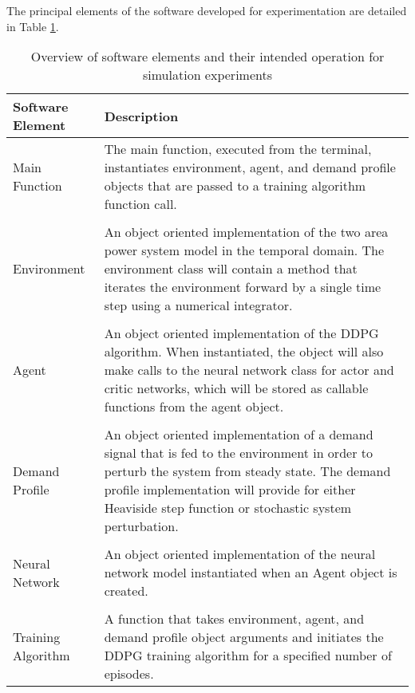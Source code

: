 The principal elements of the software developed for experimentation are detailed in Table \ref{tab:software_elements}.
\begin{table}[h]
	\centering
	\caption{Overview of software elements and their intended operation for simulation experiments}
	\begin{tabular}{lp{10cm}}
		\toprule
		\textbf{Software Element} & \textbf{Description} \\
		\midrule
		Main Function & The main function, executed from the terminal, instantiates environment, agent, and demand profile objects that are passed to a training algorithm function call.\\
		 & \\
		Environment & An object oriented implementation of the two area power system model in the temporal domain. The environment class will contain a method that iterates the environment forward by a single time step using a numerical integrator.\\
		 & \\
		Agent & An object oriented implementation of the DDPG algorithm. When instantiated, the object will also make calls to the neural network class for actor and critic networks, which will be stored as callable functions from the agent object. \\
		 & \\
		Demand Profile & An object oriented implementation of a demand signal that is fed to the environment in order to perturb the system from steady state. The demand profile implementation will provide for either Heaviside step function or stochastic system perturbation.\\
		 & \\
		Neural Network & An object oriented implementation of the neural network model instantiated when an Agent object is created.\\
		 & \\
		Training Algorithm & A function that takes environment, agent, and demand profile object arguments and initiates the DDPG training algorithm for a specified number of episodes.\\
		\bottomrule
	\end{tabular}
	\label{tab:software_elements}
\end{table}

